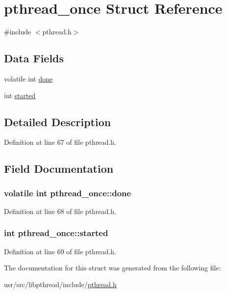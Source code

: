 \hypertarget{structpthread__once}{\section{pthread\+\_\+once Struct Reference}
\label{structpthread__once}
}


{\ttfamily \#include $<$pthread.\+h$>$}

\subsection*{Data Fields}
\begin{DoxyCompactItemize}
\item 
volatile int \hyperlink{structpthread__once_acffdc3852414e4eeece3c8e7cf80ffc1}{done}
\item 
int \hyperlink{structpthread__once_a2bebfebb49a5c75d10119824d5bba93c}{started}
\end{DoxyCompactItemize}


\subsection{Detailed Description}


Definition at line 67 of file pthread.\+h.



\subsection{Field Documentation}
\hypertarget{structpthread__once_acffdc3852414e4eeece3c8e7cf80ffc1}{
\subsubsection[{done}]{\setlength{\rightskip}{0pt plus 5cm}volatile int pthread\+\_\+once\+::done}}\label{structpthread__once_acffdc3852414e4eeece3c8e7cf80ffc1}


Definition at line 68 of file pthread.\+h.

\hypertarget{structpthread__once_a2bebfebb49a5c75d10119824d5bba93c}{
\subsubsection[{started}]{\setlength{\rightskip}{0pt plus 5cm}int pthread\+\_\+once\+::started}}\label{structpthread__once_a2bebfebb49a5c75d10119824d5bba93c}


Definition at line 69 of file pthread.\+h.



The documentation for this struct was generated from the following file\+:\begin{DoxyCompactItemize}
\item 
usr/src/libpthread/include/\hyperlink{pthread_8h}{pthread.\+h}\end{DoxyCompactItemize}
